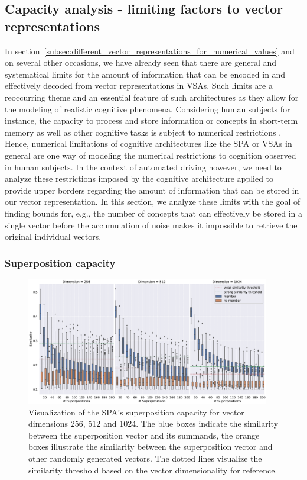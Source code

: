 \subsection{Capacity analysis - limiting factors to vector representations}%
\label{subsec:capacity_analysis_limitations_to_vector_representations}

In section~\ref{subsec:different_vector_representations_for_numerical_values} and on several other occasions, we have already seen that there are general and systematical limits for the amount of information that can be encoded in and effectively decoded from vector representations in \acp{VSA}.
Such limits are a reoccurring theme and an essential feature of such architectures as they allow for the modeling of realistic cognitive phenomena.
Considering human subjects for instance, the capacity to process and store information or concepts in short-term memory as well as other cognitive tasks is subject to numerical restrictions \parencite{Miller1956}.
Hence, numerical limitations of cognitive architectures like the \ac{SPA} or \acp{VSA} in general are one way of modeling the numerical restrictions to cognition observed in human subjects.
In the context of automated driving however, we need to analyze these restrictions imposed by the cognitive architecture applied to provide upper borders regarding the amount of information that can be stored in our vector representation.
In this section, we analyze these limits with the goal of finding bounds for, e.g., the number of concepts that can effectively be stored in a single vector before the accumulation of noise makes it impossible to retrieve the original individual vectors.

\subsubsection{Superposition capacity}%
\label{ssubsec:superposition_capacity}

\begin{figure}[t]
	\centering
	\includegraphics[width=0.95\textwidth]{imgs/spa_superposition_capacity.eps}
	\caption{Visualization of the \ac{SPA}'s superposition capacity for vector dimensions \num{256}, \num{512} and \num{1024}.
    The blue boxes indicate the similarity between the superposition vector and its summands, the orange boxes illustrate the similarity between the superposition vector and other randomly generated vectors.
    The dotted lines visualize the similarity threshold based on the vector dimensionality for reference.}
	\label{fig:spa_superposition_capacity}
\end{figure}

